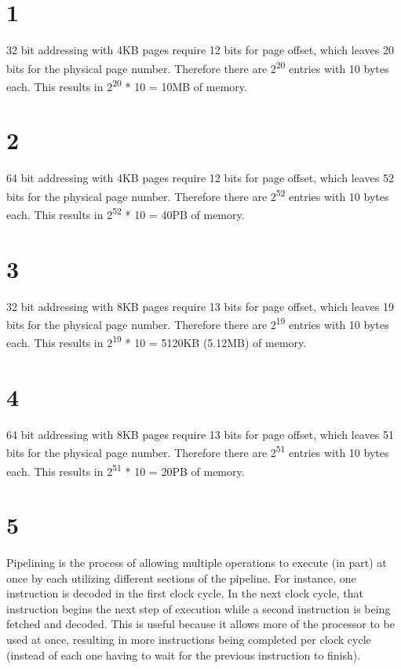 \documentclass[letterpaper,10pt,titlepage]{article}
\begin{document}
\section{1}
32 bit addressing with 4KB pages require 12 bits for page offset, which leaves
20 bits for the physical page number. Therefore there are 2\textsuperscript{20} entries with 10 bytes
each. This results in 2\textsuperscript{20} * 10 = 10MB of memory.  

\section{2}
64 bit addressing with 4KB pages require 12 bits for page offset, which leaves
52 bits for the physical page number. Therefore there are 2\textsuperscript{52} entries with 10 bytes
each. This results in 2\textsuperscript{52} * 10 = 40PB of memory.  

\section{3}
32 bit addressing with 8KB pages require 13 bits for page offset, which leaves
19 bits for the physical page number. Therefore there are 2\textsuperscript{19} entries with 10 bytes
each. This results in 2\textsuperscript{19} * 10 = 5120KB (5.12MB) of memory.  

\section{4}
64 bit addressing with 8KB pages require 13 bits for page offset, which leaves
51 bits for the physical page number. Therefore there are 2\textsuperscript{51} entries with 10 bytes
each. This results in 2\textsuperscript{51} * 10 = 20PB of memory.  

\section{5}
Pipelining is the process of allowing multiple operations to execute (in part) at once by each
utilizing different sections of the pipeline. For instance, one instruction is decoded in the first
clock cycle. In the next clock cycle, that instruction begins the next step of execution while a second
instruction is being fetched and decoded. This is useful because it allows more of the processor to be
used at once, resulting in more instructions being completed per clock cycle (instead of each one 
having to wait for the previous instruction to finish). 
\end{document}
